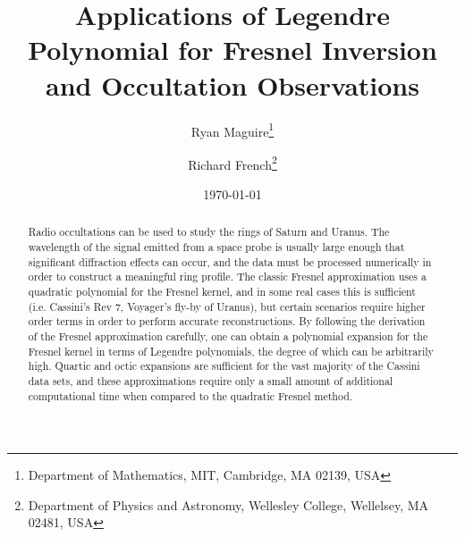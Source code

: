 \documentclass{article}
\title{%
    Applications of Legendre Polynomial for
    Fresnel Inversion and Occultation Observations%
}
\author{%
    Ryan Maguire\footnote{%
        Department of Mathematics,
        MIT, Cambridge, MA 02139, USA
    }
    \and
    Richard French\footnote{
        Department of Physics and Astronomy,
        Wellesley College, Wellelsey, MA 02481, USA
    }
}
\date{\today}
\begin{document}
    \maketitle
    \begin{abstract}
        Radio occultations can be used to study the rings of Saturn and
        Uranus. The wavelength of the signal emitted from a space probe is
        usually large enough that significant diffraction effects can occur,
        and the data must be processed numerically in order to construct a
        meaningful ring profile. The classic Fresnel approximation uses a
        quadratic polynomial for the Fresnel kernel, and in some real cases
        this is sufficient (i.e. Cassini's Rev 7, Voyager's fly-by of Uranus),
        but certain scenarios require higher order terms in order to perform
        accurate reconstructions. By following the derivation of the
        Fresnel approximation carefully, one can obtain a polynomial expansion
        for the Fresnel kernel in terms of Legendre polynomials, the degree
        of which can be arbitrarily high. Quartic and octic
        expansions are sufficient for the vast majority of the Cassini data
        sets, and these approximations require only a small amount of
        additional computational time when compared to the quadratic Fresnel
        method.
    \end{abstract}
    \tableofcontents
\end{document}
